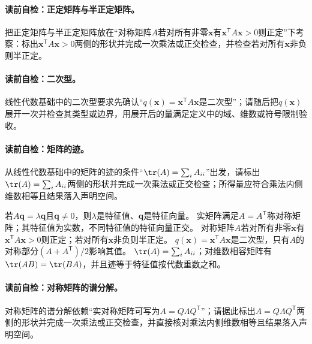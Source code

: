 \paragraph{读前自检：正定矩阵与半正定矩阵。}把正定矩阵与半正定矩阵放在“对称矩阵$A$若对所有非零$\boldsymbol{x}$有$\boldsymbol{x}^{\mathsf T}A\boldsymbol{x}>0$则正定”下考察：标出$\boldsymbol{x}^{\mathsf T}A\boldsymbol{x}>0$两侧的形状并完成一次乘法或正交检查，并检查若对所有$\boldsymbol{x}$非负则半正定。\par
\paragraph{读前自检：二次型。}线性代数基础中的二次型要求先确认“$q(\boldsymbol{x})=\boldsymbol{x}^{\mathsf T}A\boldsymbol{x}$是二次型”；请随后把$q(\boldsymbol{x})$展开一次并检查其类型或边界，用展开后的量满足定义中的域、维数或符号限制验收。\par
\paragraph{读前自检：矩阵的迹。}从线性代数基础中的矩阵的迹的条件“$\tr(A)=\sum_iA_{ii}$”出发，请标出$\tr(A)=\sum_iA_{ii}$两侧的形状并完成一次乘法或正交检查；所得量应符合乘法内侧维数相等且结果落入声明空间。\par

若$A\boldsymbol{q}=\lambda\boldsymbol{q}$且$\boldsymbol{q}\ne0$，则$\lambda$是特征值、$\boldsymbol{q}$是特征向量。
实矩阵满足$A=A^{\mathsf T}$称对称矩阵；其特征值为实数，不同特征值的特征向量正交。
对称矩阵$A$若对所有非零$\boldsymbol{x}$有$\boldsymbol{x}^{\mathsf T}A\boldsymbol{x}>0$则正定；若对所有$\boldsymbol{x}$非负则半正定。
$q(\boldsymbol{x})=\boldsymbol{x}^{\mathsf T}A\boldsymbol{x}$是二次型，只有$A$的对称部分$(A+A^{\mathsf T})/2$影响其值。
$\tr(A)=\sum_iA_{ii}$；对维数相容矩阵有$\tr(AB)=\tr(BA)$，并且迹等于特征值按代数重数之和。


\paragraph{读前自检：对称矩阵的谱分解。}对称矩阵的谱分解依赖“实对称矩阵可写为$A=Q\Lambda Q^{\mathsf T}$”；请据此标出$A=Q\Lambda Q^{\mathsf T}$两侧的形状并完成一次乘法或正交检查，并直接核对乘法内侧维数相等且结果落入声明空间。\par
